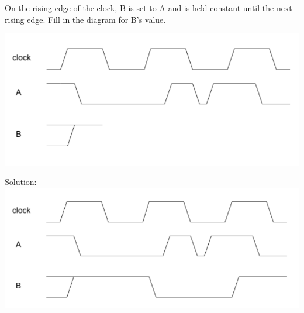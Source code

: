 \begin{blocksection}
\question
On the rising edge of the clock, B is set to A and is held constant until the next rising edge.  Fill in the diagram for B’s value.

\includegraphics[width=\textwidth]{images/sds/basics_a.png}
\begin{solution}
Solution:
\includegraphics[width=\textwidth]{images/sds/basics_a_sol.png}
\end{solution}

\end{blocksection}